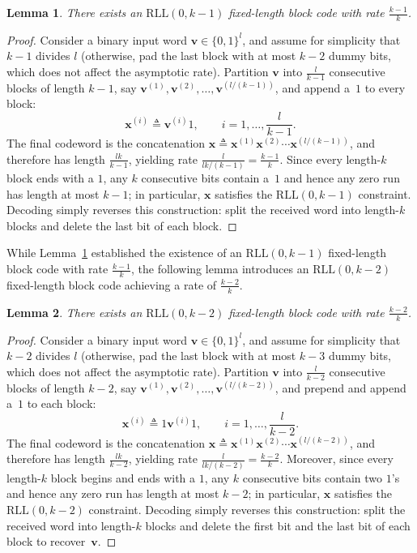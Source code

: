 \documentclass[journal,letterpaper,onecolumn,11pt]{IEEEtran}
\newcommand{\boldv}{\mathbf{v}}
\newcommand{\boldx}{\mathbf{x}}
\newtheorem{lemma}{Lemma}
\begin{document}
\begin{lemma}\label{lemma: there exists an RLL fixed length code}
    There exists an $\mathrm{RLL}(0,k-1)$ fixed-length block code with rate $\frac{k-1}{k}$.
\end{lemma}
\begin{proof}
    Consider a binary input word $\boldv\in\{0,1\}^l$, and assume for simplicity that $k-1$ divides $l$ (otherwise, pad the last block with at most $k-2$ dummy bits, which does not affect the asymptotic rate).
    Partition $\boldv$ into $\frac{l}{k-1}$ consecutive blocks of length $k-1$, say $\boldv^{(1)},\boldv^{(2)},\dots,\boldv^{(l/(k-1))}$, and append a~$1$ to every block:
    \[
        \boldx^{(i)} \triangleq \boldv^{(i)}1,\qquad i=1,\dots,\frac{l}{k-1}.
    \]
    The final codeword is the concatenation $\boldx \triangleq \boldx^{(1)}\boldx^{(2)}\cdots \boldx^{(l/(k-1))}$, and therefore has length $\frac{lk}{k-1}$, yielding rate $\frac{l}{lk/(k-1)}=\frac{k-1}{k}$.
    Since every length-$k$ block ends with a $1$, any $k$ consecutive bits contain a~$1$ and hence any zero run has length at most $k-1$; in particular, $\boldx$ satisfies the $\mathrm{RLL}(0,k-1)$ constraint.
    Decoding simply reverses this construction: split the received word into length-$k$ blocks and delete the last bit of each block.
\end{proof}
While Lemma~\ref{lemma: there exists an RLL fixed length code} established the existence of an $\mathrm{RLL}(0, k-1)$ fixed-length block code with rate $\frac{k-1}{k}$, the following lemma introduces an $\mathrm{RLL}(0, k-2)$ fixed-length block code achieving a rate of $\frac{k-2}{k}$.
\begin{lemma}\label{lemma: there exists another RLL fixed length code}
    There exists an $\mathrm{RLL}(0,k-2)$ fixed-length block code with rate $\frac{k-2}{k}$.
\end{lemma}
\begin{proof}
    Consider a binary input word $\boldv\in\{0,1\}^l$, and assume for simplicity that $k-2$ divides $l$ (otherwise, pad the last block with at most $k-3$ dummy bits, which does not affect the asymptotic rate).
    Partition $\boldv$ into $\frac{l}{k-2}$ consecutive blocks of length $k-2$, say $\boldv^{(1)},\boldv^{(2)},\dots,\boldv^{(l/(k-2))}$, and prepend and append a~$1$ to each block:
    \[
        \boldx^{(i)} \triangleq 1\boldv^{(i)}1,\qquad i=1,\dots,\frac{l}{k-2}.
    \]
    The final codeword is the concatenation $\boldx \triangleq \boldx^{(1)}\boldx^{(2)}\cdots \boldx^{(l/(k-2))}$, and therefore has length $\frac{lk}{k-2}$, yielding rate $\frac{l}{lk/(k-2)}=\frac{k-2}{k}$.
    Moreover, since every length-$k$ block begins and ends with a $1$, any $k$ consecutive bits contain two $1$'s and hence any zero run has length at most $k-2$; in particular, $\boldx$ satisfies the $\mathrm{RLL}(0,k-2)$ constraint.
    Decoding simply reverses this construction: split the received word into length-$k$ blocks and delete the first bit and the last bit of each block to recover~$\boldv$.
\end{proof}
\end{document}
